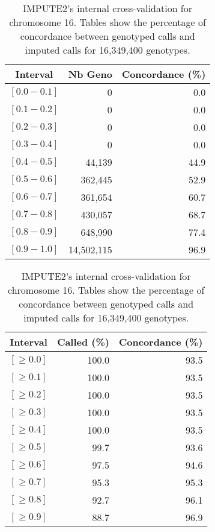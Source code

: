 \documentclass[10pt,twoside,english]{scrartcl}
\begin{document}
\begin{table}[H]
\protect\caption{IMPUTE2's internal cross-validation for chromosome 16. Tables show the
percentage of concordance between genotyped calls and imputed calls
for 16,349,400 genotypes.\label{tab:cross_validation_chr_16}}

\centering

\begin{tabular}{crr}
\hline 
\multicolumn{1}{c}{\textbf{Interval}}
 & \multicolumn{1}{c}{\textbf{Nb Geno}}
 & \multicolumn{1}{c}{\textbf{Concordance (\%)}}
\\
\hline 

$[0.0-0.1]$ & 0 & 0.0\\
$[0.1-0.2]$ & 0 & 0.0\\
$[0.2-0.3]$ & 0 & 0.0\\
$[0.3-0.4]$ & 0 & 0.0\\
$[0.4-0.5]$ & 44,139 & 44.9\\
$[0.5-0.6]$ & 362,445 & 52.9\\
$[0.6-0.7]$ & 361,654 & 60.7\\
$[0.7-0.8]$ & 430,057 & 68.7\\
$[0.8-0.9]$ & 648,990 & 77.4\\
$[0.9-1.0]$ & 14,502,115 & 96.9\\
\hline 
\end{tabular}
\hfill
\begin{tabular}{crr}
\hline 
\multicolumn{1}{c}{\textbf{Interval}}
 & \multicolumn{1}{c}{\textbf{Called (\%)}}
 & \multicolumn{1}{c}{\textbf{Concordance (\%)}}
\\
\hline 

$[\geq 0.0]$ & 100.0 & 93.5\\
$[\geq 0.1]$ & 100.0 & 93.5\\
$[\geq 0.2]$ & 100.0 & 93.5\\
$[\geq 0.3]$ & 100.0 & 93.5\\
$[\geq 0.4]$ & 100.0 & 93.5\\
$[\geq 0.5]$ & 99.7 & 93.6\\
$[\geq 0.6]$ & 97.5 & 94.6\\
$[\geq 0.7]$ & 95.3 & 95.3\\
$[\geq 0.8]$ & 92.7 & 96.1\\
$[\geq 0.9]$ & 88.7 & 96.9\\
\hline 
\end{tabular}


\end{table}
\end{document}
